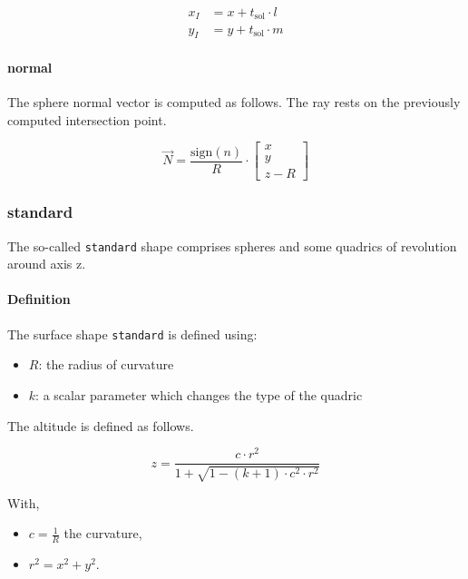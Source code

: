 \begin{equation} \begin{aligned}
x_I &= x + t_\textrm{sol} \cdot l \\
y_I &= y + t_\textrm{sol} \cdot m
\end{aligned} \end{equation}

\paragraph{normal}
The sphere normal vector is computed as follows. The ray rests on the previously
computed intersection point.

\begin{equation}
\overrightarrow{N} =
\frac{\textrm{sign}(n)}{R} \cdot
\begin{bmatrix} x \\ y \\ z - R \end{bmatrix}
\end{equation}

\subsubsection{standard}
The so-called \lstinline{standard} shape comprises spheres and some quadrics of
revolution around axis z.

\paragraph{Definition}
The surface shape \lstinline{standard} is defined using:
\begin{itemize}
\item $R$: the radius of curvature
\item $k$: a scalar parameter which changes the type of the quadric
\end{itemize}

The altitude is defined as follows.

\begin{equation} \label{eq:standard-z}
z = \frac{c \cdot r^2}{1 + \sqrt{1 - (k + 1) \cdot c^2 \cdot r^2}}
\end{equation}

With,
\begin{itemize}
\item $c = \frac{1}{R}$ the curvature,
\item $r^2 = x^2 + y^2$.
\end{itemize}

